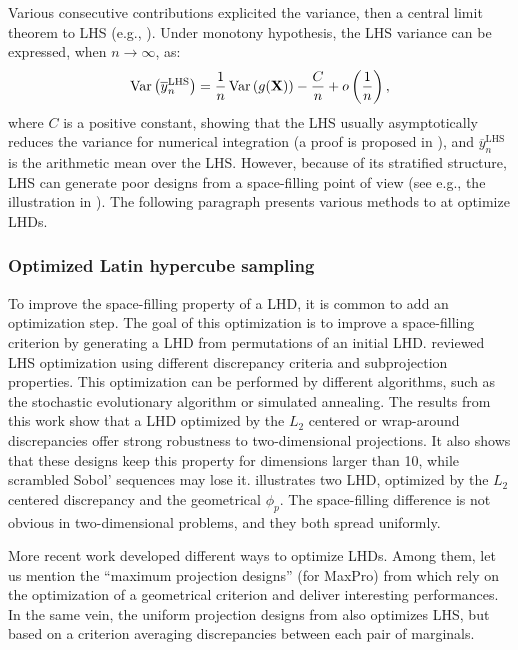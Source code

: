 Various consecutive contributions explicited the variance, then a central limit theorem to LHS (e.g., \citealp{owen_1992_tcl_lhs}). 
Under monotony hypothesis, the LHS variance can be expressed, when $n\rightarrow\infty$, as:
\begin{equation}
    \operatorname{Var}\left(\overline{y}_n^{\textrm{LHS}}\right) = \frac{1}{n} \operatorname{Var}\left(g({\bf X})\right) - \frac{C}{n} + o\left( \frac1n \right), 
\end{equation}
where $C$ is a positive constant, showing that the LHS usually asymptotically reduces the variance for numerical integration (a proof is proposed in \citealp{stein_1987_lhs}), and $\overline{y}_n^{\textrm{LHS}}$ is the arithmetic mean over the LHS. 
However, because of its stratified structure, LHS can generate poor designs from a space-filling point of view (see e.g., the illustration in ). 
The following paragraph presents various methods to at optimize LHDs.


\subsubsection{Optimized Latin hypercube sampling}
To improve the space-filling property of a LHD, it is common to add an optimization step. 
The goal of this optimization is to improve a space-filling criterion by generating a LHD from permutations of an initial LHD. 
\citet{damblin_couplet_2013} reviewed LHS optimization using different discrepancy criteria and subprojection properties. 
This optimization can be performed by different algorithms, such as the stochastic evolutionary algorithm or simulated annealing. 
The results from this work show that a LHD optimized by the $L_2$ centered or wrap-around discrepancies offer strong robustness to two-dimensional projections. 
It also shows that these designs keep this property for dimensions larger than 10, while scrambled Sobol' sequences may lose it. 
 illustrates two LHD, optimized by the $L_2$ centered discrepancy and the geometrical $\phi_p$. 
The space-filling difference is not obvious in two-dimensional problems, and they both spread uniformly.    

More recent work developed different ways to optimize LHDs. 
Among them, let us mention the ``maximum projection designs'' (for MaxPro) from \citet{joseph_gul_2015} which rely on the optimization of a geometrical criterion and deliver interesting performances. 
In the same vein, the uniform projection designs from \citet{sun_2019} also optimizes LHS, but based on a criterion averaging discrepancies between each pair of marginals.

